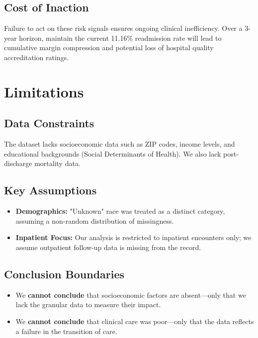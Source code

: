 \documentclass[12pt,a4paper]{article}
\begin{document}
\subsection{Cost of Inaction}
Failure to act on these risk signals ensures ongoing clinical inefficiency. Over a 3-year horizon, maintain the current 11.16\% readmission rate will lead to cumulative margin compression and potential loss of hospital quality accreditation ratings.

\section{Limitations}
\subsection{Data Constraints}
The dataset lacks socioeconomic data such as ZIP codes, income levels, and educational backgrounds (Social Determinants of Health). We also lack post-discharge mortality data.

\subsection{Key Assumptions}
\begin{itemize}
    \item \textbf{Demographics:} "Unknown" race was treated as a distinct category, assuming a non-random distribution of missingness.
    \item \textbf{Inpatient Focus:} Our analysis is restricted to inpatient encounters only; we assume outpatient follow-up data is missing from the record.
\end{itemize}

\subsection{Conclusion Boundaries}
\begin{itemize}
    \item We \textbf{cannot conclude} that socioeconomic factors are absent—only that we lack the granular data to measure their impact.
    \item We \textbf{cannot conclude} that clinical care was poor—only that the data reflects a failure in the transition of care.
\end{itemize}

\end{document}
